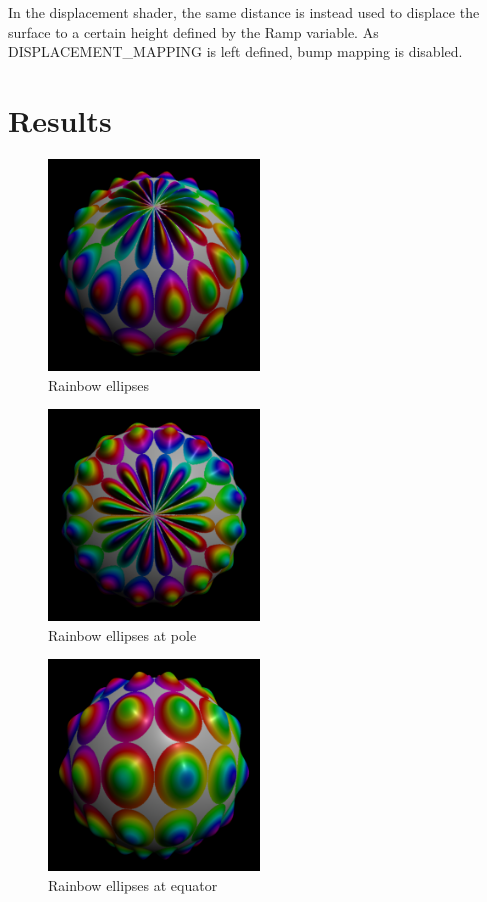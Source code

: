\documentclass[12pt,letterpaper]{article}
\begin{document}
In the displacement shader, the same distance is instead used to displace the
surface to a certain height defined by the Ramp variable. As
DISPLACEMENT\_MAPPING is left defined, bump mapping is disabled.


\newpage
\section*{Results}

\begin{figure}[!h]
    \centering
    \includegraphics[width=0.5\textwidth]{img/p2_25.png}
    \caption{Rainbow ellipses}
    \label{fig:ellipses}
\end{figure}

\begin{figure}[!h]
    \centering
    \includegraphics[width=0.5\textwidth]{img/p2_0.png}
    \caption{Rainbow ellipses at pole}
\end{figure}

\begin{figure}[!h]
    \centering
    \includegraphics[width=0.5\textwidth]{img/p2_90.png}
    \caption{Rainbow ellipses at equator}
\end{figure}
\end{document}
